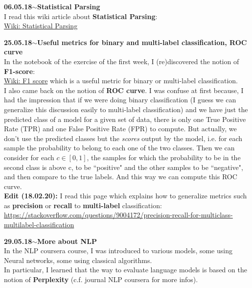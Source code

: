 \documentclass[11pt,a4paper]{article}
\newenvironment{loggentry}[2]%
{\noindent\textbf{#1}\hspace{1cm}$\mathbf{\sim}$\text{ }\textbf{#2}\\}{\vspace{0.5cm}}
\begin{document}
\begin{loggentry}{06.05.18}{Statistical Parsing}
I read this wiki article about \textbf{Statistical Parsing}:\\
\href{https://en.wikipedia.org/wiki/Statistical_parsing}{Wiki: Statistical Parsing}\\
\end{loggentry}

\begin{loggentry}{25.05.18}{Useful metrics for binary and multi-label classification, ROC curve}
In the notebook of the exercise of the first week, I (re)discovered the notion of \textbf{F1-score}:\\
\href{https://en.wikipedia.org/wiki/F1_score}{Wiki: F1 score}
which is a useful metric for binary or multi-label classification.\\
I also came back on the notion of \textbf{ROC curve}. I was confuse at first because, I had the impression that if we were doing binary classification (I guess we can generalize this discussion easily to multi-label classification) and we have just the predicted class of a model for a given set of data, there is only one True Positive Rate (TPR) and one False Positive Rate (FPR) to compute. But actually, we don't use the predicted classes but the \textit{scores} output by the model, i.e. for each sample the probability to belong to each one of the two classes. Then we can consider for each $c\in [0,1]$, the samples for which the probability to be in the second class is above c, to be ``positive" and the other samples to be ``negative", and then compare to the true labels. And this way we can compute this ROC curve.\\
\textbf{Edit (18.02.20):} I read this page which explains how to generalize metrics such as \textbf{precision} or \textbf{recall} to \textbf{multi-label} classification:\\
\url{https://stackoverflow.com/questions/9004172/precision-recall-for-multiclass-multilabel-classification}
\end{loggentry}

\begin{loggentry}{29.05.18}{More about NLP}
In the NLP coursera course, I was introduced to various models, some using Neural networks, some using classical algorithms.\\
In particular, I learned that the way to evaluate language models is based on the notion of \textbf{Perplexity} (c.f. journal NLP coursera for more infos).
\end{loggentry}
\end{document}
